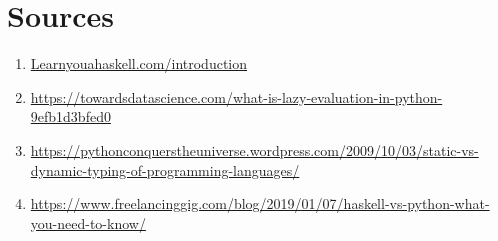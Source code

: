 \documentclass{article}
\begin{document}
\section{Sources}

\begin{enumerate}
\item \href {http://learnyouahaskell.com/introduction}{Learnyouahaskell.com/introduction}
\item \href {https://towardsdatascience.com/what-is-lazy-evaluation-in-python-9efb1d3bfed0} {https://towardsdatascience.com/what-is-lazy-evaluation-in-python-9efb1d3bfed0}
\item \href {https://pythonconquerstheuniverse.wordpress.com/2009/10/03/static-vs-dynamic-typing-of-programming-languages/} {https://pythonconquerstheuniverse.wordpress.com/2009/10/03/static-vs-dynamic-typing-of-programming-languages/}
\item\href {https://www.freelancinggig.com/blog/2019/01/07/haskell-vs-python-what-you-need-to-know/}{https://www.freelancinggig.com/blog/2019/01/07/haskell-vs-python-what-you-need-to-know/}
\end{enumerate}
\end{document}
